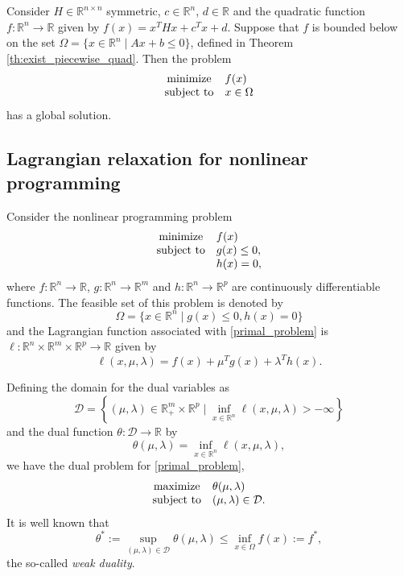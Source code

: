 \documentclass[smallextended,referee,envcountsect]{svjour3}
\newcommand{\R}{\mathbb{R}}
\begin{document}
\begin{corollary}
\label{c:exist_quad}
Consider $H\in\R^{n\times n}$ symmetric, $c\in\R^n$, $d\in\R$ and the quadratic function 
$f:\R^n\to\R$ given by $f(x)=x^THx+c^Tx+d$. Suppose that $f$ is bounded below on the set 
$\Omega=\{x\in\R^n\mid Ax+b\leq 0\}$, defined in Theorem \ref{th:exist_piecewise_quad}. 
Then the problem 
$$
\begin{array}{cl}
\displaystyle{\rm minimize } & f(x) \\
{\rm subject\ to} & x\in\Omega
\end{array}
$$
has a global solution.
\end{corollary}


\subsection{Lagrangian relaxation for nonlinear programming}
\label{sec:dual}
Consider the nonlinear programming problem 
\begin{equation}
\label{primal_problem}
\begin{array}{cl}
\displaystyle\mathop{\rm minimize }  & f(x) \\
{\rm subject\ to } & g(x)\leq 0, \\
& h(x)=0, 
\end{array}
\end{equation}
where $f:\R^n\to\R$, $g:\R^n\to\R^m$ and $h:\R^n\to\R^p$ are continuously differentiable 
functions. The feasible set of this problem is denoted by 
$$
\Omega=\{x\in\R^n\mid g(x)\leq 0, h(x)=0\}
$$
and the Lagrangian function associated with \eqref{primal_problem} is 
$\ell:\R^n\times\R^m\times\R^p\to\R$ given by
$$
\ell(x,\mu,\lambda)=f(x)+\mu^Tg(x)+\lambda^Th(x).
$$

Defining the domain for the dual variables as 
$$
\mathcal{D}=\left\{(\mu,\lambda)\in\R_+^m\times\R^p
\mid\inf_{x\in\R^n}\ell(x,\mu,\lambda)>-\infty\right\}
$$
and the dual function $\theta:\mathcal{D}\to\R$ by 
$$
\theta(\mu,\lambda)=\displaystyle\inf_{x\in\R^n}\ell(x,\mu,\lambda),
$$ 
we have the dual problem for \eqref{primal_problem}, 
$$
\begin{array}{cl}
\displaystyle\mathop{\rm maximize }  & \theta(\mu,\lambda) \\
{\rm subject\ to } & (\mu,\lambda)\in\mathcal{D}.
\end{array}
$$
It is well known that 
\begin{equation}
\label{weak_duality}
\theta^*:=\sup_{(\mu,\lambda)\in\mathcal{D}}\theta(\mu,\lambda)
\leq\inf_{x\in\Omega}f(x):=f^*,
\end{equation}
the so-called {\em weak duality}.
\end{document}
